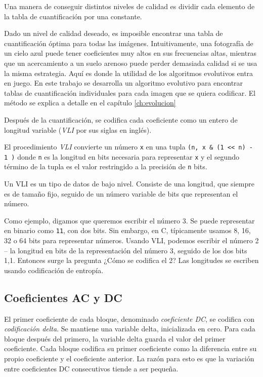 Una manera de conseguir distintos niveles de calidad es dividir cada elemento
de la tabla de cuantificación por una constante.

Dado un nivel de calidad deseado, es imposible encontrar una tabla de
cuantificación óptima para todas las imágenes. Intuitivamente, una fotografía
de un cielo azul puede tener coeficientes muy altos en sus frecuencias altas,
mientras que un acercamiento a un suelo arenoso puede perder demasiada calidad
si se usa la misma estrategia. Aquí es donde la utilidad de los algoritmos
evolutivos entra en juego. En este trabajo se desarrolla un \gls{algoritmo
evolutivo} para encontrar tablas de cuantificación individuales para cada
imagen que se quiera codificar. El método se explica a detalle en el capítulo
\ref{ch:evolucion}

Después de la cuantificación, se codifica cada coeficiente como un entero de
longitud variable (\emph{\gls{VLI}} por sus siglas en inglés).

El procedimiento \emph{VLI} convierte un número \verb+x+ en una tupla \verb+(n, x & (1 << n) - 1 )+
donde \verb+n+ es la longitud en bits necesaria para
representar \verb+x+ y el segundo término de la tupla es el valor restringido a
la precisión de \verb+n+ bits.

Un VLI es un tipo de datos de bajo nivel. Consiste de una longitud, que siempre
es de tamaño fijo, seguido de un número variable de bits que representan el
número.

Como ejemplo, digamos que queremos escribir el número 3. Se puede representar
en binario como \verb+11+, con dos bits. Sin embargo, en C, típicamente usamos
8, 16, 32 o 64 bits para representar números. Usando VLI, podemos escribir el
número 2 -- la longitud en bits de la representación del número 3, seguido
de los dos bits 1,1. Entonces surge la pregunta  ¿Cómo se codifica el 2? Las
longitudes se escriben usando codificación de entropía.

\subsection{Coeficientes AC y DC}\label{sub:acdc}

El primer coeficiente de cada bloque, denominado \emph{\gls{coeficiente DC}},
se codifica con \emph{\gls{codificación delta}}. Se mantiene una variable
delta, inicializada en cero. Para cada bloque después del primero, la variable
delta guarda el valor del primer coeficiente. Cada bloque codifica su primer
coeficiente como la diferencia entre su propio coeficiente y el coeficiente
anterior. La razón para esto es que la variación entre coeficientes DC
consecutivos tiende a ser pequeña.

